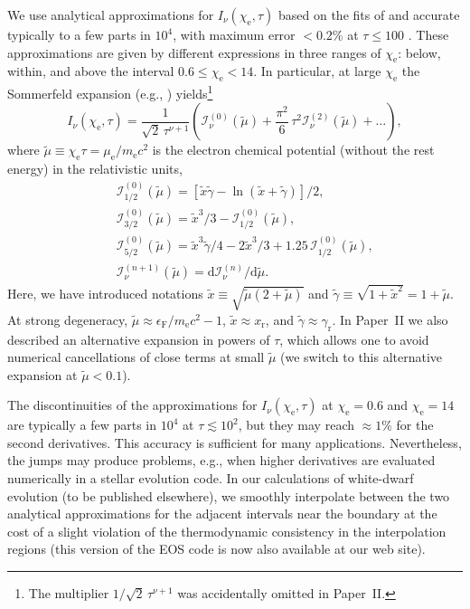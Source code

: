 \documentclass[traditabstract]{aa}
\newcommand{\beq}{\begin{equation}}
\newcommand{\eeq}{\end{equation}}
\newcommand{\bea}{\begin{eqnarray}}
\newcommand{\eea}{\end{eqnarray}}
\newcommand{\chie}{\chi_\mathrm{e}}
\newcommand{\dd}{\mathrm{d}} %
\newcommand{\gr}{\gamma_\mathrm{r}}
\newcommand{\EF}{\epsilon_\mathrm{F}}
\newcommand{\mel}{m_\mathrm{e}}
\newcommand{\mue}{\mu_\mathrm{e}}
\newcommand{\xr}{x_\mathrm{r}}
\begin{document}
We use analytical approximations for $I_\nu(\chie,\tau)$
based on the fits of \citet{Blin} and accurate typically to
a few parts in $10^4$, with maximum error $<0.2$\% at
$\tau\leq100$ \citep{CP98}. These approximations are given
by different expressions in three ranges of $\chie$: below,
within, and above the interval $0.6\leq\chie<14$.  In
particular, at large $\chie$ the Sommerfeld expansion (e.g.,
\citealp{Chandra,Girifalco}) yields\footnote{The 
multiplier $1/\sqrt{2}\,\tau^{\nu+1}$
was accidentally omitted in Paper~II.}
\beq
     I_\nu(\chie,\tau) =
        \frac{1}{\sqrt{2}\,\tau^{\nu+1}}\left(
        \mathcal{I}_\nu^{(0)}(\tilde\mu)
          +\frac{\pi^2}{6}\,\tau^2 \mathcal{I}_\nu^{(2)}(\tilde\mu)
            + \ldots \right),
\label{Sommer}
\eeq
where  $\tilde\mu\equiv\chie\tau=\mue/\mel c^2$ is the
electron chemical potential (without the rest energy) in the
relativistic units,
\bea&&
\mathcal{I}_{1/2}^{(0)}(\tilde\mu)
 = [\tilde{x}\tilde{\gamma}-\ln(\tilde{x}+\tilde{\gamma}) ]/2,
\label{I12}
\\&&
\mathcal{I}_{3/2}^{(0)}(\tilde\mu)
 = \tilde{x}^3/3 - \mathcal{I}_{1/2}^{(0)}(\tilde\mu),
\\&&
\mathcal{I}_{5/2}^{(0)}(\tilde\mu)
 = \tilde{x}^3\tilde{\gamma}/4 - 2 \tilde{x}^3/3
  + 1.25\,\mathcal{I}_{1/2}^{(0)}(\tilde\mu),
\label{I52}
\\&&
   \mathcal{I}_\nu^{(n+1)}(\tilde\mu)
   =
    {\dd \mathcal{I}_\nu^{(n)}}/{\dd\tilde\mu} .
\eea
Here, we have introduced notations
$\tilde{x} \equiv \sqrt{\tilde\mu(2+\tilde\mu)}$ and
$\tilde{\gamma} \equiv \sqrt{1+\tilde{x}^2} = 1+\tilde\mu$.
At strong degeneracy, $\tilde{\mu}\approx\EF/\mel c^2-1$,
$\tilde{x}\approx\xr$, and $\tilde{\gamma}\approx\gr$. In
Paper~II we also described an alternative expansion in powers
of $\tau$, which allows one to avoid numerical cancellations
of close terms at small $\tilde\mu$ 
(we switch to this alternative expansion at $\tilde\mu<0.1$). 

The discontinuities of the \citet{Blin} approximations for
$I_\nu(\chie,\tau)$ at $\chie=0.6$ and $\chie=14$ are
typically a few parts in $10^4$ at $\tau\lesssim10^2$, but
they may reach $\approx1$\% for the second derivatives. 
This accuracy is sufficient for many applications.
Nevertheless, the jumps may produce problems, e.g., when
higher derivatives are evaluated numerically in a stellar
evolution code. In our calculations of white-dwarf evolution
(to be published elsewhere), we smoothly interpolate between
the two analytical approximations for the adjacent intervals
near the boundary at the cost of a slight violation of the
thermodynamic consistency in the interpolation regions (this
version of the EOS code is now also available at our web
site).
\end{document}
